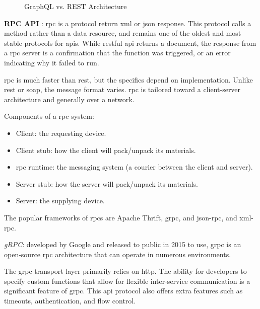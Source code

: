 \begin{multicols}{2}
\begin{figure}[htbp]
      \caption{GraphQL vs. REST Architecture}
      \label{fig:graphqlvsrestarchitecture}
\end{figure}
\begin{multicols}{2} %
      \textbf{RPC API} : \acrshort{rpc} is a protocol return \acrshort{xml} or \acrshort{json} response. This protocol
      calls a method rather than a data resource, and remains one of the oldest and most stable protocols for
      \acrshort{api}s. While \acrshort{rest}ful \acrshort{api} returns a document, the response from a \acrshort{rpc}
      server is a confirmation that the function was triggered, or an error indicating  why it failed to run.

      \acrshort{rpc} is much faster than \acrshort{rest}, but the specifics depend on implementation. Unlike
      \acrshort{rest} or \acrshort{soap}, the message format varies. \acrshort{rpc} is tailored toward a client-server
      architecture and generally over a network.

      Components of a \acrshort{rpc} system:
      \begin{itemize}[label=$\star$]
            \item Client: the requesting device.
            \item Client stub: how the client will pack/unpack its materials.
            \item \acrshort{rpc} runtime: the messaging system (a courier between the client and server).
            \item Server stub: how the server will pack/unpack its materials.
            \item Server: the supplying device.
      \end{itemize}

      The popular frameworks of \acrshort{rpc}s are Apache Thrift, \acrshort{grpc}, and \acrshort{json}-\acrshort{rpc},
      and \acrshort{xml}-\acrshort{rpc}.

      \textit{gRPC}: developed by Google and released to public in 2015 to use, \acrshort{grpc} is an open-source
      \acrshort{rpc} architecture that can operate in numerous environments.

      The \acrshort{grpc} transport layer primarily relies on \acrshort{http}. The ability for developers to specify
      custom functions that allow for flexible inter-service communication is a significant feature of \acrshort{grpc}.
      This \acrshort{api} protocol also offers extra features such as timeouts, authentication, and flow control.


\end{multicols}
\end{multicols}
